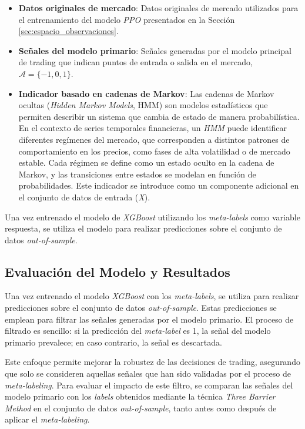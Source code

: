 \documentclass[a4paper,12pt, twoside]{report}
\begin{document}
\begin{itemize}
    \item \textbf{Datos originales de mercado}: Datos originales de mercado utilizados para 
    el entrenamiento del modelo \textit{PPO} presentados en la Sección \ref{sec:espacio_observaciones}.
    \item \textbf{Señales del modelo primario}: Señales generadas por el modelo 
    principal de trading que indican puntos de entrada o salida en el mercado, $\mathcal{A} = \{-1, 0, 1\}$.
    \item \textbf{Indicador basado en cadenas de Markov}: Las cadenas de Markov ocultas 
    (\textit{Hidden Markov Models}, HMM) son modelos estadísticos que permiten describir 
    un sistema que cambia de estado de manera probabilística. En el contexto de series 
    temporales financieras, un \textit{HMM} puede identificar diferentes regímenes del 
    mercado, que corresponden a distintos patrones de comportamiento en los precios, 
    como fases de alta volatilidad o de mercado estable. Cada régimen se define como 
    un estado oculto en la cadena de Markov, y las transiciones entre estados se 
    modelan en función de probabilidades. Este indicador se introduce como un 
    componente adicional en el conjunto de datos de entrada (\textit{X}).
    
\end{itemize}

Una vez entrenado el modelo de \textit{XGBoost} utilizando los \textit{meta-labels} como 
variable respuesta, se utiliza el modelo para realizar predicciones sobre el conjunto de 
datos \textit{out-of-sample}. 


\subsection{Evaluación del Modelo y Resultados}

Una vez entrenado el modelo \textit{XGBoost} con los \textit{meta-labels}, se utiliza para realizar 
predicciones sobre el conjunto de datos \textit{out-of-sample}. Estas predicciones se emplean para 
filtrar las señales generadas por el modelo primario. El proceso de filtrado es sencillo: si la 
predicción del \textit{meta-label} es 1, la señal del modelo primario prevalece; en caso contrario, 
la señal es descartada.

Este enfoque permite mejorar la robustez de las decisiones de trading, asegurando que solo se 
consideren aquellas señales que han sido validadas por el proceso de \textit{meta-labeling}. Para 
evaluar el impacto de este filtro, se comparan las señales del modelo primario con los \textit{labels} 
obtenidos mediante la técnica \textit{Three Barrier Method} en el conjunto de 
datos \textit{out-of-sample}, tanto antes como después de aplicar el \textit{meta-labeling}.
\end{document}
